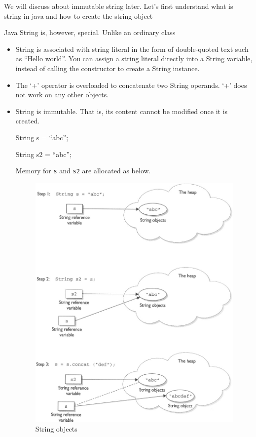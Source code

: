 \documentclass[11pt,a4paper]{article}
\begin{document}
We will discuss about immutable string later. Let's first understand what is string in java and how to create the string object

Java String is, however, special. Unlike an ordinary class
 \begin{itemize}
  \item String is associated with string literal in the form of double-quoted text such as ``Hello world''. You can assign a string literal directly into a String variable, instead of calling the constructor to create a String instance.
\item The `+' operator is overloaded to concatenate two String operands. `+' does not work on any other objects.
\item String is immutable. That is, its content cannot be modified once it is created. 

String s = ``abc'';

String s2 = ``abc'';

Memory for \texttt{s} and \texttt{s2} are allocated as below.
\vfill{\ }
\begin{figure}[H]
 \begin{center}
   \includegraphics[scale=.4]{string.jpg}
\caption{String objects}
  \end{center}
 \end{figure}
 \end{itemize}
\end{document}
